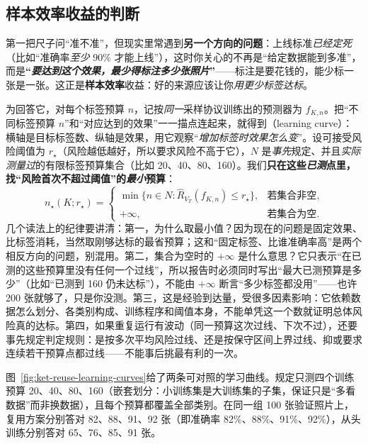 \subsection{样本效率收益的判断}
\label{sec:ket-reuse-sample-efficiency}

第一把尺子问“准不准”，但现实里常遇到\textbf{另一个方向的问题}：上线标准\emph{已经定死}（比如“准确率\emph{至少} 90\% 才能上线”），这时你关心的不再是“给定数据能到多准”，而是\textbf{“\emph{要达到这个效果，\emph{最少}得标注多少张照片}”}——标注是要花钱的，能少标一张是一张。这正是\textbf{样本效率}收益：好的来源应该让你\emph{用更少标签达标}。

为回答它，对每个标签预算 $n$，记按\emph{同一}采样协议训练出的预测器为 $f_{K,n}$。把“不同标签预算 $n$”和“对应达到的效果”一一描点连起来，就得到（learning curve）：横轴是目标标签数、纵轴是效果，用它观察“\emph{增加标签时效果怎么变}”。设可接受风险阈值为 $r_\star$（风险越低越好，所以要求风险不高于它），$N$ 是\emph{事先}规定、并且\emph{实际测量过}的有限标签预算集合（比如 20、40、80、160）。我们\textbf{只在这些\emph{已测}点里，找“风险首次不超过阈值”的\emph{最小}预算}：
\begin{equation}
  n_\star(K;r_\star)
  =
  \begin{cases}
    \min\{n\in N:\hat R_{V_T}(f_{K,n})\leq r_\star\},
      & \text{若集合非空},\\
    +\infty, & \text{若集合为空}.
  \end{cases}
  \label{eq:ket-reuse-label-threshold}
\end{equation}
几个读法上的纪律要讲清：第一，为什么取最小值？因为现在的问题是固定效果、比标签消耗，当然取刚够达标的最省预算；这和“固定标签、比谁准确率高”是两个相反方向的问题，别混用。第二，集合为空时的 $+\infty$ 是什么意思？它只表示“在已测的这些预算里没有任何一个过线”，所以报告时必须同时写出“最大已测预算是多少”（比如“已测到 160 仍未达标”），不能由 $+\infty$ 断言“多少标签都没用”——也许 200 张就够了，只是你没测。第三，这是经验到达量，受很多因素影响：它依赖数据怎么划分、各类别构成、训练程序和阈值本身，不能单凭这一个数就证明总体风险真的达标。第四，如果重复运行有波动（同一预算这次过线、下次不过），还要事先规定判定规则：是按多次平均风险过线、还是按保守区间上界过线、抑或要求连续若干预算点都过线——不能事后挑最有利的一次。

图~\ref{fig:ket-reuse-learning-curves}给了两条可对照的学习曲线。规定只测四个训练预算 20、40、80、160（嵌套划分：小训练集是大训练集的子集，保证只是“多看数据”而非换数据），且每个预算都覆盖全部类别。在同一组 100 张验证照片上，复用方案分别答对 82、88、91、92 张（即准确率 82\%、88\%、91\%、92\%），从头训练分别答对 65、76、85、91 张。

